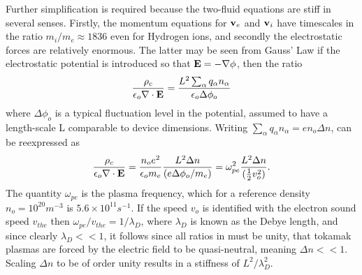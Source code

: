 Further simplification is required because the two-fluid equations are 
stiff in several senses.  Firstly, the momentum equations for ${\bf 
v}_e$ and ${\bf v}_i$ have timescales in the ratio $m_i/m_e \approx 1836$ even for
Hydrogen ions, and secondly the electrostatic forces  are relatively enormous.  The
latter may be seen from Gauss' Law  if the  electrostatic potential is introduced so that
${\bf E} = - \nabla  \phi$, then the ratio
\label{eq:e2.12}
\begin{equation}
\frac{\rho_c}{\epsilon_o \nabla \cdot {\bf E}}
=
\frac{L^2 \sum_\alpha q_\alpha n_\alpha}{\epsilon_o \Delta \phi_o}
\end{equation}
where $\Delta \phi_o$ is a typical fluctuation level in the potential, 
assumed to have a length-scale L comparable to device dimensions.  Writing $\sum_\alpha  q_\alpha 
n_\alpha  = en_o \Delta  n$,  can be reexpressed as
\label{eq:e2.13}
\begin{equation}
\frac{\rho_c}{\epsilon_o \nabla \cdot {\bf E}} =
\frac{n_o e^2}{\epsilon_o m_e}
\frac{L^2 \Delta n}{(e \Delta \phi_o/m_e)} = \omega^2_{pe}
\frac{L^2 \Delta n}
{(\frac{1}{2} v_o^2)}.
\end{equation}
The quantity $\omega_{pe}$ is the plasma frequency, which for a reference density $n_o
=  10^{20} m^{-3}$ is $5.6 \times 10^{11}s^{-1}$.  If the speed $v_o$ is 
identified with the electron sound speed $v_{the}$ then $\omega_{pe}/v_{the} =
1/\lambda_D$, where $\lambda_D$ is known as the Debye length, and since clearly
$\lambda_D << 1$, it follows since all ratios in  must be unity, that tokamak
plasmas are forced by the electric field to be  quasi-neutral, meaning $\Delta n <<
1$.  Scaling $\Delta n$  to be of order unity results in a stiffness
of $L^2/\lambda^2_D$.

